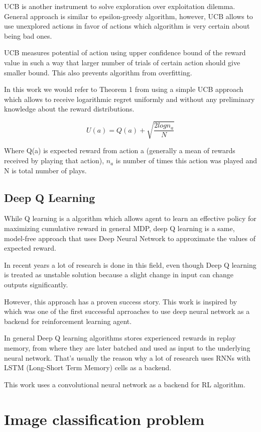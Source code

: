 UCB is another instrument to solve exploration over exploitation dilemma. General approach is similar to epsilon-greedy algorithm, however, UCB allows to use unexplored actions in favor of actions which algorithm is very certain about being bad ones.

UCB measures potential of action using upper confidence bound of the reward value in such a way that larger number of trials of certain action should give smaller bound. This also prevents algorithm from overfitting.

In this work we would refer to Theorem 1 from \cite{Auer2002} using a simple UCB approach which allows to receive logarithmic regret uniformly and without any preliminary knowledge about the reward distributions.

\[
U(a) = Q(a) + \sqrt{\frac{2 log n_a}{N}}
\]

Where Q(a) is expected reward from action a (generally a mean of rewards received by playing that action), $n_a$ is number of times this action was played and N is total number of plays.
\subsection{Deep Q Learning}
While Q learning is a algorithm which allows agent to learn an effective policy for maximizing cumulative reward in general MDP, deep Q learning is a same, model-free approach that uses Deep Neural Network to approximate the values of expected reward.

In recent years a lot of research is done in this field, even though Deep Q learning is treated as unstable solution because a slight change in input can change outputs significantly.

However, this approach has a proven success story. This work is inspired by \cite{MnihKSGAWR13} which was one of the first successful aprroaches to use deep neural network as a backend for reinforcement learning agent.

In general Deep Q learning algorithms stores experienced rewards in replay memory, from where they are later batched and used as input to the underlying neural network. That's usually the reason why a lot of research uses RNNs with LSTM (Long-Short Term Memory) cells as a backend.

This work uses a convolutional neural network as a backend for RL algorithm.
\section{Image classification problem}

